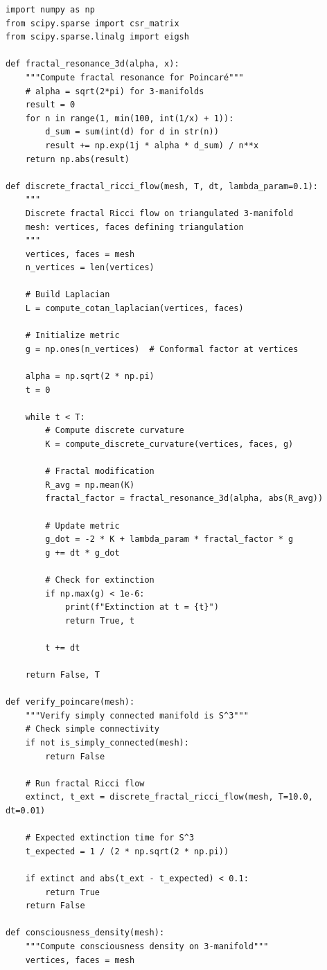 \documentclass[12pt]{article}
\begin{document}
\begin{verbatim}
import numpy as np
from scipy.sparse import csr_matrix
from scipy.sparse.linalg import eigsh

def fractal_resonance_3d(alpha, x):
    """Compute fractal resonance for Poincaré"""
    # alpha = sqrt(2*pi) for 3-manifolds
    result = 0
    for n in range(1, min(100, int(1/x) + 1)):
        d_sum = sum(int(d) for d in str(n))
        result += np.exp(1j * alpha * d_sum) / n**x
    return np.abs(result)

def discrete_fractal_ricci_flow(mesh, T, dt, lambda_param=0.1):
    """
    Discrete fractal Ricci flow on triangulated 3-manifold
    mesh: vertices, faces defining triangulation
    """
    vertices, faces = mesh
    n_vertices = len(vertices)
    
    # Build Laplacian
    L = compute_cotan_laplacian(vertices, faces)
    
    # Initialize metric
    g = np.ones(n_vertices)  # Conformal factor at vertices
    
    alpha = np.sqrt(2 * np.pi)
    t = 0
    
    while t < T:
        # Compute discrete curvature
        K = compute_discrete_curvature(vertices, faces, g)
        
        # Fractal modification
        R_avg = np.mean(K)
        fractal_factor = fractal_resonance_3d(alpha, abs(R_avg))
        
        # Update metric
        g_dot = -2 * K + lambda_param * fractal_factor * g
        g += dt * g_dot
        
        # Check for extinction
        if np.max(g) < 1e-6:
            print(f"Extinction at t = {t}")
            return True, t
            
        t += dt
    
    return False, T

def verify_poincare(mesh):
    """Verify simply connected manifold is S^3"""
    # Check simple connectivity
    if not is_simply_connected(mesh):
        return False
    
    # Run fractal Ricci flow
    extinct, t_ext = discrete_fractal_ricci_flow(mesh, T=10.0, dt=0.01)
    
    # Expected extinction time for S^3
    t_expected = 1 / (2 * np.sqrt(2 * np.pi))
    
    if extinct and abs(t_ext - t_expected) < 0.1:
        return True
    return False

def consciousness_density(mesh):
    """Compute consciousness density on 3-manifold"""
    vertices, faces = mesh
    

\end{verbatim}
\end{document}

